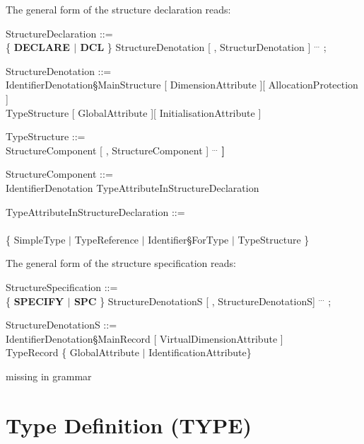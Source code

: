 The general form of the structure declaration reads:

\begin{front}
StructureDeclaration ::=\\
\x \{ {\bf DECLARE $\mid$ DCL} \} StructureDenotation [ , StructurDenotation ] $^{...}$ ;

StructureDenotation ::=\\
\x IdentifierDenotation\S MainStructure [ DimensionAttribute ][ AllocationProtection ]\\
\x TypeStructure [ GlobalAttribute ][ InitialisationAttribute ]

TypeStructure ::=\\
\x {\bf STRUCT [} StructureComponent [ , StructureComponent ] $^{...}$ {\bf ]}

StructureComponent ::=\\
\x IdentifierDenotation TypeAttributeInStructureDeclaration

TypeAttributeInStructureDeclaration ::=\\
\x [ DimensionAttribute ] \\
\x \{ SimpleType $\mid$ TypeReference $\mid$ Identifier\S ForType $\mid$ TypeStructure \}
\end{front}
\begin{grammar}






\end{grammar}

The general form of the structure specification reads:

\begin{front}
StructureSpecification ::=\\
\x \{ {\bf SPECIFY $\mid$ SPC} \} StructureDenotationS [ , StructureDenotationS] $^{...}$ ;

StructureDenotationS ::=\\
\x IdentifierDenotation\S MainRecord [ VirtualDimensionAttribute ]\\
\x [ AllocationProtection ] TypeRecord \{ GlobalAttribute $\mid$ IdentificationAttribute\}
\end{front}
\begin{grammar}
missing in grammar
\end{grammar}

\section{Type Definition (TYPE)} %

